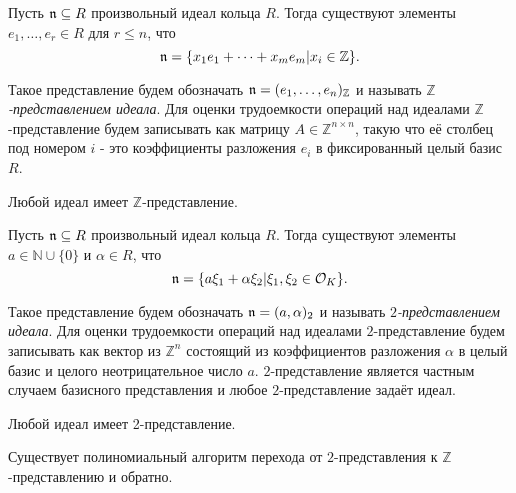 \documentclass[_00_dissertation.tex]{subfiles}
\begin{document}
\begin{definition}
    Пусть $\mathfrak{n} \subseteq R$ произвольный идеал кольца $R$.
    Тогда существуют элементы $e_1, \dots, e_r \in R$ для $r \leq n$, что
    \begin{equation*}
        \mathfrak{n} = \{x_1 e_1 + \dots + x_m e_m | x_i \in \mathbb{Z}\}.
    \end{equation*}

    Такое представление будем обозначать $\mathfrak{n} = (e_1, \dots, e_n)_{\mathbb{Z}}$ и называть \emph{$\mathbb{Z}$-представлением идеала}.
    Для оценки трудоемкости операций над идеалами $\mathbb{Z}$-представление будем записывать как матрицу $A \in \mathbb{\mathbb{Z}}^{n \times n}$, такую что её столбец под номером $i$ - это коэффициенты разложения $e_i$ в фиксированный целый базис $R$.
\end{definition}

\begin{statement}\cite{source:Cohen, source:Post}
    Любой идеал имеет $\mathbb{Z}$-представление.
\end{statement}

\begin{definition}
    Пусть $\mathfrak{n} \subseteq R$ произвольный идеал кольца $R$.
    Тогда существуют элементы $a \in \mathbb{N} \cup \{0\}$ и $\alpha \in R$, что 
    \begin{equation*}
        \mathfrak{n} = \{a \xi_1 + \alpha \xi_2 | \xi_1, \xi_2 \in \mathcal{O}_K\}.
    \end{equation*}

    Такое представление будем обозначать $\mathfrak{n} = (a, \alpha)_2$ и называть \emph{$2$-представлением идеала}.
    Для оценки трудоемкости операций над идеалами $2$-представление будем записывать как вектор из $\mathbb{Z}^n$ состоящий из коэффициентов разложения $\alpha$ в целый базис и целого неотрицательное число $a$.
    $2$-представление является частным случаем базисного представления и любое $2$-представление задаёт идеал.
\end{definition}

\begin{statement}\cite{source:Cohen, source:Post}
    Любой идеал имеет 2-представление.
\end{statement}

\begin{statement}\cite{Post}
    Существует полиномиальный алгоритм перехода от $2$-представления к $\mathbb{Z}$-представлению и обратно.
\end{statement}
\end{document}
